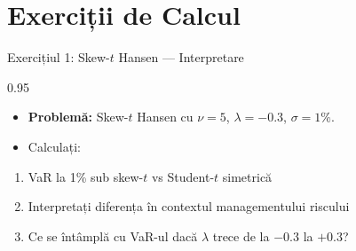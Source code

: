 \documentclass[9pt, aspectratio=169, t]{beamer}
\begin{document}
\section{Exerciții de Calcul}

\begin{frame}{Exercițiul 1: Skew-$t$ Hansen --- Interpretare}
    \begin{cminipage}{0.95\textwidth}
    \begin{itemize}\setlength{\itemsep}{0pt}
        \item \textbf{Problemă:} Skew-$t$ Hansen cu $\nu = 5$, $\lambda = -0.3$, $\sigma = 1\%$.
        \item Calculați:
    \end{itemize}
    \begin{enumerate}\setlength{\itemsep}{0pt}
        \item VaR la 1\% sub skew-$t$ vs Student-$t$ simetrică
        \item Interpretați diferența în contextul managementului riscului
        \item Ce se întâmplă cu VaR-ul dacă $\lambda$ trece de la $-0.3$ la $+0.3$?
    \end{enumerate}
    \end{cminipage}
\end{frame}
\end{document}

